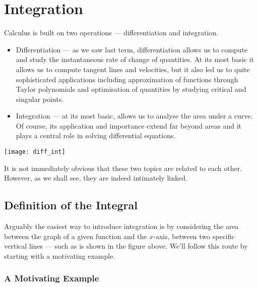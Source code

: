 %
%

\graphicspath{{./figures/integration/}}


\def\showissues{y}
\def\showintremarks{n}


\chapter{Integration} \label{chap integral}
Calculus is built on two operations --- differentiation and integration.

\begin{itemize}
\item Differentiation --- as we saw last term, differentiation allows us to compute and
study the instantaneous rate of change of quantities. At its most basic it
allows us to compute tangent lines and velocities, but it also led us to quite
sophisticated applications including approximation of functions
through Taylor polynomials and optimisation of quantities by studying critical
and singular points.
\item Integration --- at its most basic, allows us to analyse the area under a
curve. Of course, its application and importance extend far beyond areas and it plays a
central role in solving differential equations.
\end{itemize}
\begin{efig}
 \begin{center}
  \texttt{[image: diff\_int]}
 \end{center}
\end{efig}
It is not immediately obvious that these two topics are related to each other.
However, as we shall see, they are indeed intimately linked.
\section{Definition of the Integral}\label{sec:intdef}

Arguably the easiest way to introduce integration is by considering the area between
the graph of a given function and the $x$-axis, between two specific vertical lines ---
such as is shown in the figure above. We'll follow this route by starting with
a motivating example.

\subsection*{A Motivating Example}

